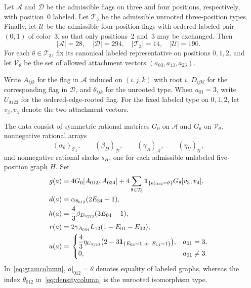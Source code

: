 Let $\mathcal A$ and $\mathcal D$ be the admissible flags on three and four positions, respectively, with position~0 labeled. Let $\mathcal T_3$ be the admissible unrooted three-position types. Finally, let $\mathcal U$ be the admissible four-position flags with ordered labeled pair $(0,1)$ of color~3, so that only positions~2 and~3 may be exchanged. Then
\begin{equation}\label{eq:flagcounts}
 |\mathcal A|=28,\quad |\mathcal D|=294,\quad
 |\mathcal T_3|=14,\quad |\mathcal U|=190.
\end{equation}
For each $\theta\in\mathcal T_3$, fix its canonical labeled representative on positions $0,1,2$, and let $\mathcal V_\theta$ be the set of allowed attachment vectors $(a_{03},a_{13},a_{23})$.

Write $A_{ijk}$ for the flag in $\mathcal A$ induced on $(i,j,k)$ with root $i$, $D_{ijkl}$ for the corresponding flag in $\mathcal D$, and $\theta_{ijk}$ for the unrooted type. When $a_{01}=3$, write $U_{0123}$ for the ordered-edge-rooted flag. For the fixed labeled type on $0,1,2$, let $v_3,v_4$ denote the two attachment vectors.

The data consist of symmetric rational matrices $G_0$ on $\mathcal A$ and $G_\theta$ on $\mathcal V_\theta$, nonnegative rational arrays
\[
 (\alpha_\theta)_{\mathcal T_3},\qquad
 (\beta_D)_{\mathcal D},\qquad
 (\gamma_A)_{\mathcal A},\qquad
 (\eta_U)_{\mathcal U},
\]
and nonnegative rational slacks $s_H$, one for each admissible unlabeled five-position graph $H$. Set
\begin{align}
 g(a)={}&4G_0[A_{012},A_{034}]
 +4\sum_{\theta\in\mathcal T_3}
   \mathbf 1_{\{a|_{012}=\theta\}}G_\theta[v_3,v_4],
 \label{eq:gramcolumn}\\
 d(a)={}&\alpha_{\theta_{012}}(2E_{34}-1),\label{eq:densitycolumn}\\
 h(a)={}&\frac43\beta_{D_{0123}}(3E_{04}-1),\label{eq:degreecolumn}\\
 r(a)={}&2\gamma_{A_{034}}L_{12}(1-E_{01}-E_{02}),\label{eq:rootcolumn}\\
 u(a)={}&\begin{cases}
 \displaystyle\frac43\eta_{U_{0123}}
 \bigl(2-3\mathbf 1_{\{E_{04}=1\ \mathrm{or}\ E_{14}=1\}}\bigr),&a_{01}=3,\\
 0,&a_{01}\ne3.
 \end{cases}\label{eq:unioncolumn}
\end{align}
In~\eqref{eq:gramcolumn}, $a|_{012}=\theta$ denotes equality of labeled graphs, whereas the index $\theta_{012}$ in~\eqref{eq:densitycolumn} is the unrooted isomorphism type.

